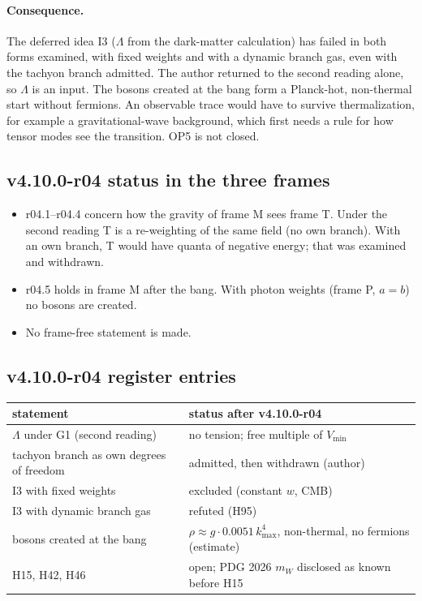 \paragraph{Consequence.}
The deferred idea I3 (\(\Lambda\) from the dark-matter calculation) has failed in both forms examined, with fixed weights and with a dynamic branch gas,
even with the tachyon branch admitted.  The author returned to the second reading alone, so \(\Lambda\) is an input.  The bosons created at the bang
form a Planck-hot, non-thermal start without fermions.  An observable trace would have to survive thermalization, for example a gravitational-wave
background, which first needs a rule for how tensor modes see the transition.  OP5 is not closed.

\subsection*{v4.10.0-r04 status in the three frames}
\label{subsec:v4100-r04-frames}

\begin{itemize}[leftmargin=2em]
\item r04.1--r04.4 concern how the gravity of frame M sees frame T.  Under the second reading T is a re-weighting of the same field (no own branch).
With an own branch, T would have quanta of negative energy; that was examined and withdrawn.
\item r04.5 holds in frame M after the bang.  With photon weights (frame P, \(a=b\)) no bosons are created.
\item No frame-free statement is made.
\end{itemize}

\subsection*{v4.10.0-r04 register entries}
\label{subsec:v4100-r04-register}

\begin{center}
\small
\begin{tabular}{@{}>{\raggedright\arraybackslash}p{}>{\raggedright\arraybackslash}p{}@{}}
\toprule
statement & status after v4.10.0-r04\\
\midrule
\(\Lambda\) under G1 (second reading) & no tension; free multiple of \(V_{\min}\)\\
tachyon branch as own degrees of freedom & admitted, then withdrawn (author)\\
I3 with fixed weights & excluded (constant \(w\), CMB)\\
I3 with dynamic branch gas & refuted (H95)\\
bosons created at the bang & \(\rho\approx g\cdot0.0051\,k_{\max}^4\), non-thermal, no fermions (estimate)\\
H15, H42, H46 & open; PDG 2026 \(m_W\) disclosed as known before H15\\
\bottomrule
\end{tabular}
\end{center}

